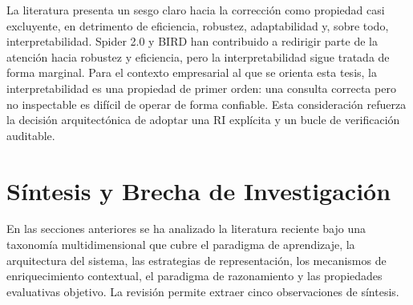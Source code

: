 La literatura presenta un sesgo claro hacia la corrección como
propiedad casi excluyente, en detrimento de eficiencia, robustez,
adaptabilidad y, sobre todo, interpretabilidad. Spider 2.0 y BIRD han
contribuido a redirigir parte de la atención hacia robustez y
eficiencia, pero la interpretabilidad sigue tratada de forma marginal.
Para el contexto empresarial al que se orienta esta tesis, la
interpretabilidad es una propiedad de primer orden: una consulta
correcta pero no inspectable es difícil de operar de forma confiable.
Esta consideración refuerza la decisión arquitectónica de adoptar una
RI explícita y un bucle de verificación auditable.

\section{Síntesis y Brecha de Investigación}
\label{sec:sota-sintesis}

En las secciones anteriores se ha analizado la literatura reciente bajo
una taxonomía multidimensional que cubre el paradigma de aprendizaje, la
arquitectura del sistema, las estrategias de representación, los
mecanismos de enriquecimiento contextual, el paradigma de razonamiento y
las propiedades evaluativas objetivo. La revisión permite extraer cinco
observaciones de síntesis.

